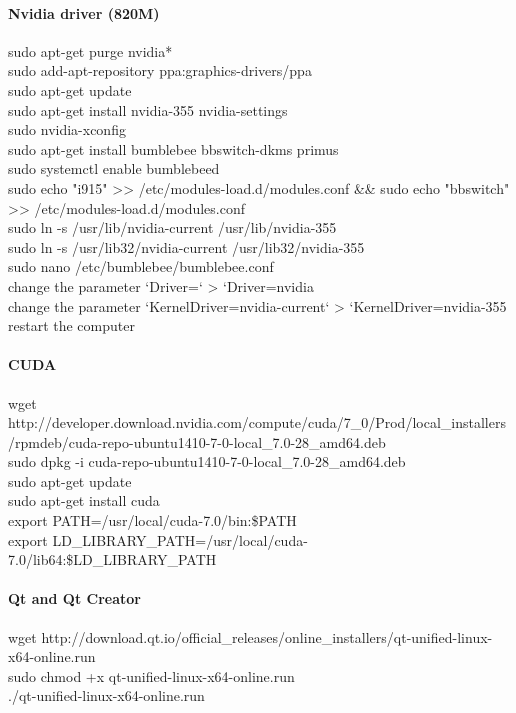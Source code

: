 \paragraph{Nvidia driver (820M)}
\begin{sBox}
	sudo apt-get purge nvidia*\\
	sudo add-apt-repository ppa:graphics-drivers/ppa\\
	sudo apt-get update\\
	sudo apt-get install nvidia-355 nvidia-settings\\
	sudo nvidia-xconfig\\
	sudo apt-get install bumblebee bbswitch-dkms primus\\
	sudo systemctl enable bumblebeed\\
	sudo echo "i915" >> /etc/modules-load.d/modules.conf \&\& sudo echo "bbswitch" >> /etc/modules-load.d/modules.conf\\  
	sudo ln -s /usr/lib/nvidia-current /usr/lib/nvidia-355\\
	sudo ln -s /usr/lib32/nvidia-current /usr/lib32/nvidia-355\\
	sudo nano /etc/bumblebee/bumblebee.conf\\
	change the parameter `Driver=` > `Driver=nvidia\\
	change the parameter `KernelDriver=nvidia-current` > `KernelDriver=nvidia-355\\
	restart the computer\\
\end{sBox}


\paragraph{CUDA}
\begin{sBox}
	wget http://developer.download.nvidia.com/compute/cuda/7\_0/Prod/local\_installers/rpmdeb/cuda-repo-ubuntu1410-7-0-local\_7.0-28\_amd64.deb\\
	sudo dpkg -i cuda-repo-ubuntu1410-7-0-local\_7.0-28\_amd64.deb\\
	sudo apt-get update\\
	sudo apt-get install cuda\\
	export PATH=/usr/local/cuda-7.0/bin:\$PATH\\
	export LD\_LIBRARY\_PATH=/usr/local/cuda-7.0/lib64:\$LD\_LIBRARY\_PATH\
\end{sBox}  
 
\paragraph{Qt and Qt Creator}
\begin{sBox}
	wget http://download.qt.io/official\_releases/online\_installers/qt-unified-linux-x64-online.run\\
	sudo chmod +x qt-unified-linux-x64-online.run\\
	./qt-unified-linux-x64-online.run\\
\end{sBox}
 
